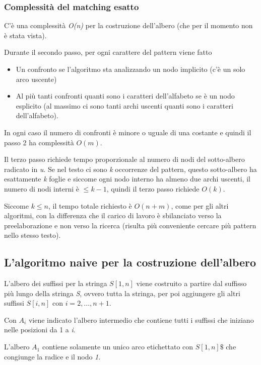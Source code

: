 \subsubsection{Complessità del matching esatto}\label{complessituxe0-del-matching-esatto}

C'è una complessità \emph{O(n)} per la costruzione dell'albero (che per il momento non è stata vista).

Durante il secondo passo, per ogni carattere del pattern viene fatto
\begin{itemize}
	\item Un confronto se l'algoritmo sta analizzando un nodo implicito (c'è un solo arco uscente)
	\item Al più tanti confronti quanti sono i caratteri dell'alfabeto se è un nodo esplicito (al massimo ci sono tanti archi uscenti quanti sono i caratteri dell'alfabeto).
\end{itemize}

In ogni caso il numero di confronti è minore o uguale di una costante e quindi il passo 2 ha complessità $ O(m) $.

Il terzo passo richiede tempo proporzionale al numero di nodi del sotto-albero radicato in \textit{u}.
Se nel testo ci sono \textit{k} occorrenze del pattern, questo sotto-albero ha esattamente \textit{k} foglie e siccome ogni nodo interno ha almeno due archi uscenti, il numero di nodi interni è $ \leq k-1 $, quindi il terzo passo richiede $ O(k) $.

Siccome $ k \leq n $, il tempo totale richiesto è $ O(n+m) $, come per gli altri algoritmi, con la differenza che il carico di lavoro è sbilanciato verso la preelaborazione e non verso la ricerca (risulta più conveniente cercare più pattern nello stesso testo).

\subsection{L'algoritmo naive per la costruzione dell'albero} \label{lalgoritmo-naive-per-la-costruzione-dellalbero}

L'albero dei suffissi per la stringa $S[1,n]$ viene costruito a partire dal suffisso più lungo della stringa \textit{S}, ovvero tutta la stringa, per poi aggiungere gli altri suffissi $S[i,n]$ con $i = 2, \ldots, n+1$. 

Con $A_i$ viene indicato l'albero intermedio che contiene tutti i suffissi che iniziano nelle posizioni da 1 a \emph{i}.

L'albero $A_1$ contiene solamente un unico arco etichettato con $S[1,n]\$$ che congiunge la radice e il nodo \emph{1}.

